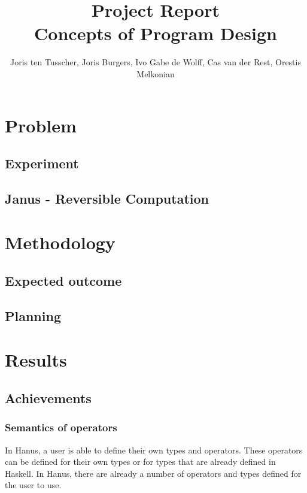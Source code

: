 \documentclass[12pt,a4paper]{article}
\title{\textbf{Project Report \\ \small{Concepts of Program Design}}}
\author{\small{Joris ten Tusscher, Joris Burgers, Ivo Gabe de Wolff, Cas van der Rest, Orestis Melkonian}}
\date{}
\begin{document}
\maketitle

\section{Problem}
    \subsection{Experiment}
    \subsection{Janus - Reversible Computation}
\section{Methodology}
	\subsection{Expected outcome}
	\subsection{Planning}
\section{Results}
	\subsection{Achievements}
	
	
	
	\subsubsection{Semantics of operators}	
	In Hanus, a user is able to define their own types and operators. These operators can be defined for their own types or for types that are already defined in Haskell. In Hanus, there are already a number of operators and types defined for the user to use. 
\end{document}
